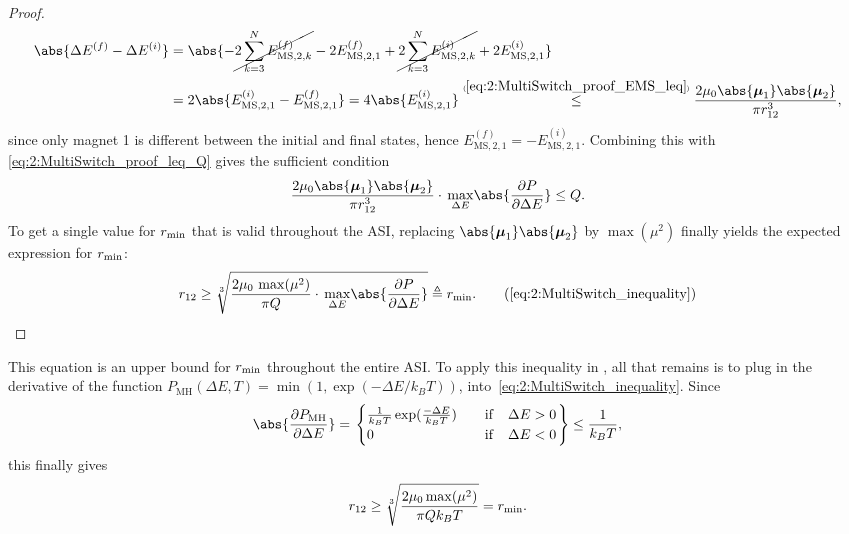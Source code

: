\begin{proof}
\begin{align*}
		\abs{\Delta E^{(f)} - \Delta E^{(i)}} &= \abs{-\cancel{2 \sum_{k=3}^N E_{\mathrm{MS},2,k}^{(f)}} -2 E_{\mathrm{MS},2,1}^{(f)} +\cancel{2 \sum_{k=3}^N E_{\mathrm{MS},2,k}^{(i)}} +2 E_{\mathrm{MS},2,1}^{(i)}} \\
		&= 2\abs{E_{\mathrm{MS},2,1}^{(i)} - E_{\mathrm{MS},2,1}^{(f)}} = 4 \abs{E_{\mathrm{MS},2,1}^{(i)}} \numeq{\ref{eq:2:MultiSwitch_proof_EMS_leq}}{\leq} \frac{2 \mu_0 \abs{\vc{\mu}_1} \abs{\vc{\mu}_2}}{\pi r_{12}^3} \mathrm{,}
	\end{align*}
	since only magnet 1 is different between the initial and final states, hence $E_{\mathrm{MS},2,1}^{(f)} = - E_{\mathrm{MS},2,1}^{(i)}$.
	Combining this with \eqref{eq:2:MultiSwitch_proof_leq_Q} gives the sufficient condition
	\begin{equation}
		\frac{2 \mu_0 \abs{\vc{\mu}_1} \abs{\vc{\mu}_2}}{\pi r_{12}^3} \cdot \, \underset{\Delta E}{\max} \abs{\frac{\partial P}{\partial \Delta E}} \leq Q \mathrm{.}
	\end{equation}
	To get a single value for $r_\mathrm{min}$ that is valid throughout the ASI, replacing $\abs{\vc{\mu}_1} \abs{\vc{\mu}_2}$ by $\max(\mu^2)$ finally yields the expected expression for $r_\mathrm{min}$:
	\begin{equation*}
		r_{12} \geq \sqrt[3]{\frac{2 \mu_0 \, \max(\mu^2)}{\pi Q} \cdot \, \underset{\Delta E}{\max} \abs{\frac{\partial P}{\partial \Delta E}}} \triangleq \rmin \mathrm{.} \tag{\ref*{eq:2:MultiSwitch_inequality}}
	\end{equation*}
\end{proof}
This equation is an upper bound for $r_\mathrm{min}$ throughout the entire ASI.
To apply this inequality in \hotspice, all that remains is to plug in the derivative of the   function $P_\mathrm{MH}(\Delta E, T) = \min(1, \exp(-\Delta E/k_B T))$, into~\cref{eq:2:MultiSwitch_inequality}.
Since
\begin{equation}
	\abs{\frac{\partial P_\mathrm{MH}}{\partial \Delta E}} = \left.\begin{cases}
		\frac{1}{k_B T} \exp(\frac{-\Delta E}{k_B T}) \quad &\mathrm{if} \quad \Delta E > 0 \\
		0 \quad &\mathrm{if} \quad \Delta E < 0
	\end{cases} \right\}
	\leq \frac{1}{k_B T} \mathrm{,}
\end{equation}
this finally gives
\begin{equation}
	r_{12} \geq \sqrt[3]{\frac{2 \mu_0 \max(\mu^2)}{\pi Q k_B T}} = r_\mathrm{min} \mathrm{.}
\end{equation}

